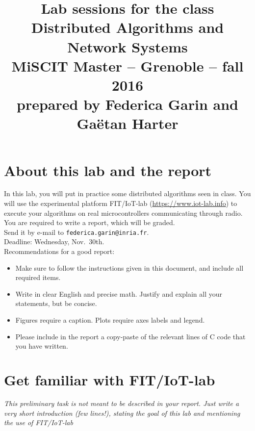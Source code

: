 \documentclass{article}
\begin{document}
\title{
{\normalsize Lab sessions for the class}\\[-1mm]
Distributed Algorithms and Network Systems\\[-2mm]
{\normalsize MiSCIT Master -- Grenoble -- fall 2016}\\[-1mm]
{\normalsize prepared by Federica Garin and Ga\"{e}tan Harter}}
\date{}
\maketitle



\section{About this lab and the report}
In this lab, you will put in practice some distributed algorithms seen in class.
You will use the experimental platform FIT/IoT-lab (\url{https://www.iot-lab.info})
to execute your algorithms on real microcontrollers communicating through radio.\\

You are required to write a report, which will be graded.\\ Send it by e-mail to \texttt{federica.garin@inria.fr}.\\
Deadline: Wednesday, Nov.~30th.\\

Recommendations for a good report:
\begin{itemize}
\item Make sure to follow the instructions given in this document, and include all required items.
\item Write in clear English and precise math. Justify and explain all your statements, but be concise.
\item Figures require a caption. Plots require axes labels and legend.
\item Please include in the report a copy-paste of the relevant lines of C code that you have written.
\end{itemize}

\newpage

\section{Get familiar with FIT/IoT-lab}


\textit{\color{blue} This preliminary task is not meant to be described in your report. Just write a very short introduction (few lines!), stating the goal of this lab and mentioning the use of FIT/IoT-lab}\\
\end{document}

